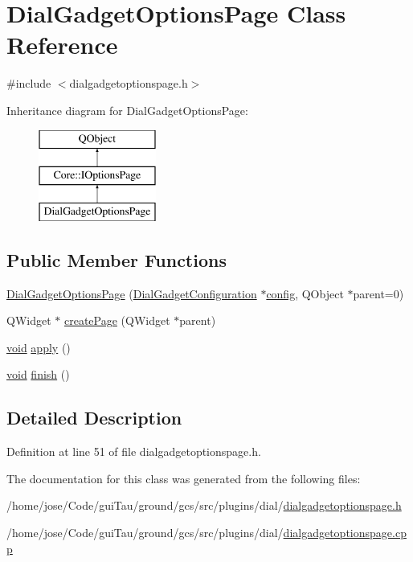 \hypertarget{class_dial_gadget_options_page}{\section{Dial\-Gadget\-Options\-Page Class Reference}
\label{class_dial_gadget_options_page}
}


{\ttfamily \#include $<$dialgadgetoptionspage.\-h$>$}

Inheritance diagram for Dial\-Gadget\-Options\-Page\-:\begin{figure}[H]
\begin{center}
\leavevmode
\includegraphics[height=3.000000cm]{class_dial_gadget_options_page}
\end{center}
\end{figure}
\subsection*{Public Member Functions}
\begin{DoxyCompactItemize}
\item 
\hyperlink{group___dial_plugin_gaeac54ffbddafca4f7d4b61d9d8af758a}{Dial\-Gadget\-Options\-Page} (\hyperlink{class_dial_gadget_configuration}{Dial\-Gadget\-Configuration} $\ast$\hyperlink{deflate_8c_a4473b5227787415097004fd39f55185e}{config}, Q\-Object $\ast$parent=0)
\item 
Q\-Widget $\ast$ \hyperlink{group___dial_plugin_gac2ea2636090b7981bddc06307c640fbb}{create\-Page} (Q\-Widget $\ast$parent)
\item 
\hyperlink{group___u_a_v_objects_plugin_ga444cf2ff3f0ecbe028adce838d373f5c}{void} \hyperlink{group___dial_plugin_gaacfb7eb82dfc96795090f651e40bd640}{apply} ()
\item 
\hyperlink{group___u_a_v_objects_plugin_ga444cf2ff3f0ecbe028adce838d373f5c}{void} \hyperlink{group___dial_plugin_gacc0c745076376c99081b3c52d916e209}{finish} ()
\end{DoxyCompactItemize}


\subsection{Detailed Description}


Definition at line 51 of file dialgadgetoptionspage.\-h.



The documentation for this class was generated from the following files\-:\begin{DoxyCompactItemize}
\item 
/home/jose/\-Code/gui\-Tau/ground/gcs/src/plugins/dial/\hyperlink{dialgadgetoptionspage_8h}{dialgadgetoptionspage.\-h}\item 
/home/jose/\-Code/gui\-Tau/ground/gcs/src/plugins/dial/\hyperlink{dialgadgetoptionspage_8cpp}{dialgadgetoptionspage.\-cpp}\end{DoxyCompactItemize}
